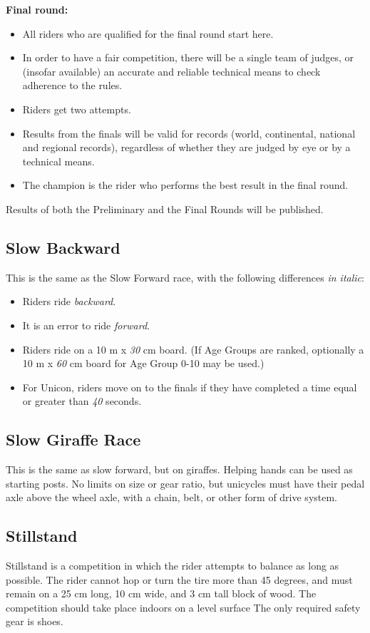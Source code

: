 \textbf{Final round:}
\begin{itemize}
\item All riders who are qualified for the final round start here.
\item In order to have a fair competition, there will be a single team of judges, or (insofar available) an accurate and reliable technical means to check adherence to the rules.
\item Riders get two attempts.
\item Results from the finals will be valid for records (world, continental, national and regional records), regardless of whether they are judged by eye or by a technical means.
\item The champion is the rider who performs the best result in the final round.
\end{itemize}

Results of both the Preliminary and the Final Rounds will be published.

\subsection{Slow Backward}
This is the same as the Slow Forward race, with the following differences \textit {in italic}:
\begin{itemize}
\item Riders ride \textit{backward}.
\item It is an error to ride \textit{forward}.
\item Riders ride on a 10 m x \textit{30} cm board.
  (If Age Groups are ranked, optionally a 10 m x \textit{60} cm board for Age Group 0-10 may be used.)
\item For Unicon, riders move on to the finals if they have completed a time equal or greater than \textit{40} seconds.
\end{itemize}

\subsection{Slow Giraffe Race}

This is the same as slow forward, but on giraffes.
Helping hands can be used as starting posts.
No limits on size or gear ratio, but unicycles must have their pedal axle above the wheel axle, with a chain, belt, or other form of drive system.

\subsection{Stillstand}
Stillstand is a competition in which the rider attempts to balance as long as possible.
The rider cannot hop or turn the tire more than 45 degrees, and must remain on a 25 cm long, 10 cm wide, and 3 cm tall block of wood.
The competition should take place indoors on a level surface
The only required safety gear is shoes.

